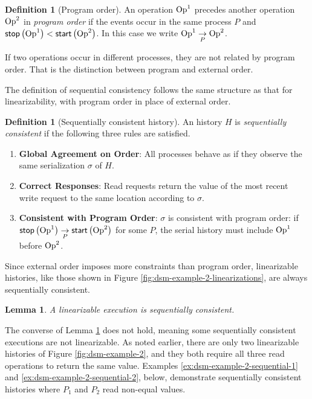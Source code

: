 \documentclass[]             %
{NASA}                       %
\newtheorem{lemma}[theorem]{Lemma}
\theoremstyle{definition}
\newtheorem{definition}[theorem]{Definition}
\providecommand{\tightlist}{%
  \setlength{\itemsep}{0pt}\setlength{\parskip}{0pt}}
\begin{document}
\begin{definition}[Program order]
  An operation $\mathrm{Op}^1$ precedes another operation $\mathrm{Op}^2$ in
  \emph{program order} if the events occur in the same process $P$ and
  $\mathsf{stop}\left(\mathrm{Op}^1\right) < \mathsf{start}\left(\mathrm{Op}^2\right)$. In this case we write
  $\mathrm{Op}^1 \underset{P}{\to} \mathrm{Op}^2$.
\end{definition}
If two operations occur in different processes, they are not related
by program order. That is the distinction between program and external
order.

The definition of sequential consistency follows the same structure as
that for linearizability, with program order in place of external
order.

\begin{definition}[Sequentially consistent history]
  \label{def:sequentially-consistent-history}
  An history $H$ is \emph{sequentially consistent} if the following
  three rules are satisfied.
\begin{enumerate}
  \tightlist
\item \textbf{Global Agreement on Order}: All processes behave as if
  they observe the same serialization $\sigma$ of $H$.
\item \textbf{Correct Responses}: Read requests return the value of
  the most recent write request to the same location according to $\sigma$.
\item \textbf{Consistent with Program Order}: $\sigma$ is consistent
  with program order: if
  $\mathsf{stop}\left(\mathrm{Op}^1\right) \underset{P}{\to} \mathsf{start}\left(\mathrm{Op}^2\right)$ for some $P$, the serial
  history must include $\mathrm{Op}^1$ before $\mathrm{Op}^2$.
\end{enumerate}
\end{definition}

Since external order imposes more constraints than program order,
linearizable histories, like those shown in Figure
\ref{fig:dsm-example-2-linearizations}, are always sequentially
consistent.
\begin{lemma}
  \label{lem:linearsequential}
  A linearizable execution is sequentially consistent.
\end{lemma}

The converse of Lemma \ref{lem:linearsequential} does not hold,
meaning some sequentially consistent executions are not
linearizable. As noted earlier, there are only two linearizable
histories of Figure \ref{fig:dsm-example-2}, and they both require all
three read operations to return the same value. Examples
\ref{ex:dsm-example-2-sequential-1} and
\ref{ex:dsm-example-2-sequential-2}, below, demonstrate sequentially
consistent histories where $P_1$ and $P_2$ read non-equal values.
\end{document}
